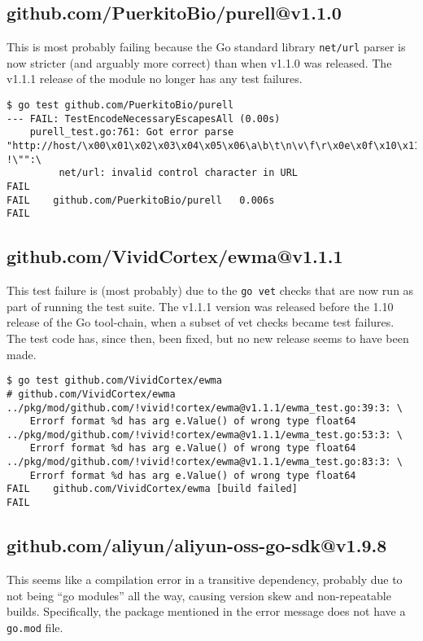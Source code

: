\documentclass[a4paper]{paper}
\begin{document}
\subsection{github.com/PuerkitoBio/purell@v1.1.0}

This is most probably failing because the Go standard library {\tt net/url}
parser is now stricter (and arguably more correct) than when v1.1.0
was released. The v1.1.1 release of the module no longer has any test
failures.

\begin{verbatim}
$ go test github.com/PuerkitoBio/purell       
--- FAIL: TestEncodeNecessaryEscapesAll (0.00s)
    purell_test.go:761: Got error parse "http://host/\x00\x01\x02\x03\x04\x05\x06\a\b\t\n\v\f\r\x0e\x0f\x10\x11\x12\x13\x14\x15\x16\x17\x18\x19\x1a\x1b\x1c\x1d\x1e\x1f !\"":\
         net/url: invalid control character in URL
FAIL
FAIL	github.com/PuerkitoBio/purell	0.006s
FAIL
\end{verbatim}

\subsection{github.com/VividCortex/ewma@v1.1.1}

This test failure is (most probably) due to the {\tt go vet} checks
that are now run as part of running the test suite. The v1.1.1 version
was released before the 1.10 release of the Go tool-chain, when a
subset of vet checks became test failures. The test code has, since
then, been fixed, but no new release seems to have been made.

\begin{verbatim}
$ go test github.com/VividCortex/ewma
# github.com/VividCortex/ewma
../pkg/mod/github.com/!vivid!cortex/ewma@v1.1.1/ewma_test.go:39:3: \
    Errorf format %d has arg e.Value() of wrong type float64
../pkg/mod/github.com/!vivid!cortex/ewma@v1.1.1/ewma_test.go:53:3: \
    Errorf format %d has arg e.Value() of wrong type float64
../pkg/mod/github.com/!vivid!cortex/ewma@v1.1.1/ewma_test.go:83:3: \
    Errorf format %d has arg e.Value() of wrong type float64
FAIL	github.com/VividCortex/ewma [build failed]
FAIL
\end{verbatim}

\subsection{github.com/aliyun/aliyun-oss-go-sdk@v1.9.8}

This seems like a compilation error in a transitive dependency,
probably due to not being ``go modules'' all the way,
causing version skew and non-repeatable builds. Specifically, the
package mentioned in the error message does not have a {\tt go.mod}
file.
\end{document}
